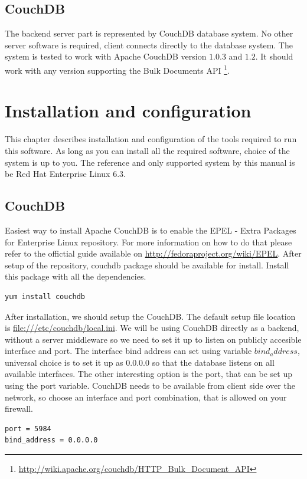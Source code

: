 \section{CouchDB}
The backend server part is represented by CouchDB database system. No other
server software is required, client connects directly to the database system.
The system is tested to work with Apache CouchDB version $1.0.3$ and $1.2$. It
should work with any version supporting the Bulk Documents API
\footnote{\url{http://wiki.apache.org/couchdb/HTTP_Bulk_Document_API}}.





\chapter{Installation and configuration}
This chapter describes installation and configuration of the tools required to
run this software. As long as you can install all the required software,
choice of the system is up to you. The reference and only supported system by
this manual is be Red Hat Enterprise Linux 6.3.

\section{CouchDB}
Easiest way to install Apache CouchDB is to enable the EPEL - Extra Packages for
Enterprise Linux repository. For more information on how to do that please refer
to the offictial guide available on \url{http://fedoraproject.org/wiki/EPEL}.
After setup of the repository, couchdb package should be available for install.
Install this package with all the dependencies.
\begin{verbatim}
yum install couchdb
\end{verbatim}
After installation, we should setup the CouchDB. The default setup file location
is \url{file:///etc/couchdb/local.ini}. We will be using CouchDB directly as a
backend, without a server middleware so we need to set it up to listen on
publicly accesible interface and port. The interface bind address can set using
variable $bind_address$, universal choice is to set it up as $0.0.0.0$ so that
the database listens on all available interfaces. The other interesting option is
the port, that can be set up using the port variable. CouchDB needs to be
available from client side over the network, so choose an interface and port combination, that is allowed on your firewall.

\begin{verbatim}
port = 5984
bind_address = 0.0.0.0
\end{verbatim}


